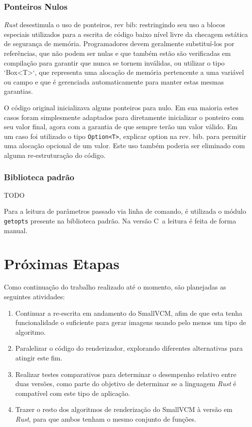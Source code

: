 \documentclass[tg]{mdtufsm}
\def\Cpp{{C\nolinebreak[4]\raisebox{.20ex}{\small\bf++}}}
\newcommand{\todo}[1]{\textsf{\color{red}#1}}
\begin{document}
\subsection{Ponteiros Nulos}

\emph{Rust} desestimula o uso de ponteiros, \todo{rev bib: restringindo seu uso a blocos especiais utilizados para a escrita de código baixo nível livre da checagem estática de segurança de memória.} Programadores devem geralmente substituí-los por referências, que não podem ser nulas e que também estão são verificadas em compilação para garantir que nunca se tornem inválidas, ou utilizar o tipo `Box<T>`, que representa uma alocação de memória pertencente a uma variável ou campo e que é gerenciada automaticamente para manter estas mesmas garantias.

O código original inicializava alguns ponteiros para nulo. Em sua maioria estes casos foram simplesmente adaptados para diretamente inicializar o ponteiro com seu valor final, agora com a garantia de que sempre terão um valor válido. Em um caso foi utilizado o tipo \texttt{Option<T>}, \todo{explicar option na rev. bib.} para permitir uma alocação opcional de um valor. Este uso também poderia ser eliminado com alguma re-estruturação do código.

\subsection{Biblioteca padrão}

\todo{TODO}

\todo{Para a leitura de parâmetros passado via linha de comando, é utilizada o módulo \texttt{getopts} presente na biblioteca padrão. Na versão \Cpp\ a leitura é feita de forma manual.}

\chapter{Próximas Etapas}

\todo{Como continuação do trabalho realizado até o momento, são planejadas as seguintes atividades:}

\begin{enumerate}
	\item Continuar a re-escrita em andamento do SmallVCM, afim de que esta tenha funcionalidade o suficiente para gerar imagens usando pelo menos um tipo de algoritmo.
	\item Paralelizar o código do renderizador, explorando diferentes alternativas para atingir este fim.
	\item Realizar testes comparativos para determinar o desempenho relativo entre duas versões, como parte do objetivo de determinar se a linguagem \emph{Rust} é compatível com este tipo de aplicação.
	\item Trazer o resto dos algoritmos de renderização do SmallVCM à versão em \emph{Rust}, para que ambos tenham o mesmo conjunto de funções.
\end{enumerate}

\setlength{\baselineskip}{\baselineskip}


\end{document}
